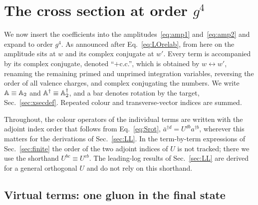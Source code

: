 \section{The cross section at order \texorpdfstring{$g^4$}{g4}}\label{sec:xsec}

We now insert the coefficients into the amplitudes~\eqref{eq:amp1} and~\eqref{eq:amp2} and expand to order $g^4$. As announced after Eq.~\eqref{eq:LOrelab}, from here on the amplitude sits at $w$ and its complex conjugate at $w'$. Every term is accompanied by its complex conjugate, denoted ``$+$c.c.'', which is obtained by $w\leftrightarrow w'$, renaming the remaining primed and unprimed integration variables, reversing the order of all valence charges, and complex conjugating the numbers. We write $\mathbb{A}\equiv\mathbb{A}_2$ and $\mathbb{A}^\dagger\equiv\mathbb{A}^\dagger_2$, and a bar denotes rotation by the target, Sec.~\ref{sec:xsecdef}. Repeated colour and transverse-vector indices are summed.

Throughout, the colour operators of the individual terms are written with the adjoint index order that follows from Eq.~\eqref{eq:Srot}, $\bar a^{\dagger d}=U^{db}a^{\dagger b}$, wherever this matters for the derivations of Sec.~\ref{sec:LL}. In the term-by-term expressions of Sec.~\ref{sec:finite} the order of the two adjoint indices of $U$ is not tracked; there we use the shorthand $U^{bc}\equiv U^{cb}$. The leading-log results of Sec.~\ref{sec:LL} are derived for a general orthogonal $U$ and do not rely on this shorthand.

\subsection{Virtual terms: one gluon in the final state}\label{sec:groupI}

